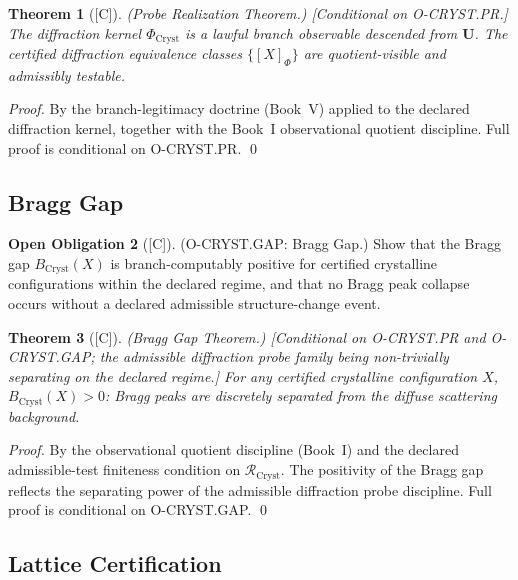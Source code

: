 \documentclass[12pt,oneside]{amsbook}
\theoremstyle{plain}
\newtheorem{theorem}{Theorem}[section]
\theoremstyle{definition}
\newtheorem{obligation}[theorem]{Open Obligation}
\theoremstyle{remark}
\newcommand{\status}[1]{\textup{[#1]}}
\begin{document}
\begin{theorem}[\status{C}]\label{thm:cryst-PR}
\textup{(Probe Realization Theorem.)}
\textup{[Conditional on O-CRYST.PR.]}
The diffraction kernel $\Phi_{\mathrm{Cryst}}$ is a lawful branch
observable descended from $\mathbf{U}$.  The certified diffraction
equivalence classes $\{[X]_{\Phi}\}$ are quotient-visible and
admissibly testable.
\end{theorem}

\begin{proof}
By the branch-legitimacy doctrine (Book~V) applied to the declared
diffraction kernel, together with the Book~I observational quotient
discipline.  Full proof is conditional on O-CRYST.PR.
\qed
\end{proof}

\subsection{Bragg Gap}

\begin{obligation}[\status{C}]\label{ob:cryst-GAP}
\textup{(O-CRYST.GAP: Bragg Gap.)}
Show that the Bragg gap $B_{\mathrm{Cryst}}(X)$ is
branch-computably positive for certified crystalline configurations
within the declared regime, and that no Bragg peak collapse occurs
without a declared admissible structure-change event.
\end{obligation}

\begin{theorem}[\status{C}]\label{thm:cryst-GAP}
\textup{(Bragg Gap Theorem.)}
\textup{[Conditional on O-CRYST.PR and O-CRYST.GAP; the admissible
diffraction probe family being non-trivially separating on the
declared regime.]}
For any certified crystalline configuration $X$,
$B_{\mathrm{Cryst}}(X) > 0$: Bragg peaks are discretely separated
from the diffuse scattering background.
\end{theorem}

\begin{proof}
By the observational quotient discipline (Book~I) and the declared
admissible-test finiteness condition on $\mathcal{R}_{\mathrm{Cryst}}$.
The positivity of the Bragg gap reflects the separating power of the
admissible diffraction probe discipline.  Full proof is conditional
on O-CRYST.GAP.
\qed
\end{proof}

\subsection{Lattice Certification}
\end{document}
